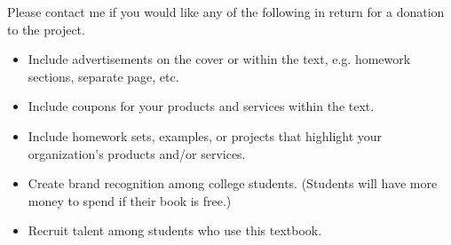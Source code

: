 \noindent Please contact me if you would like any of the following in return for a donation to the project.
\begin{itemize}
    \item Include advertisements on the cover or within the text, e.g. homework sections, separate page, etc.
    \item Include coupons for your products and services within the text.
    \item Include homework sets, examples, or projects that highlight your organization's products and/or services.
    \item Create brand recognition among college students. (Students will have more money to spend if their book is free.)
    \item Recruit talent among students who use this textbook.
\end{itemize}
